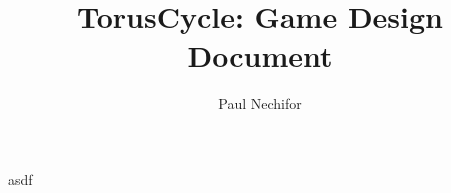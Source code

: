 \documentclass[12pt,a4paper]{report}
\title{TorusCycle: Game Design Document}
\author{Paul Nechifor}
\begin{document}
\maketitle

asdf
\end{document}

